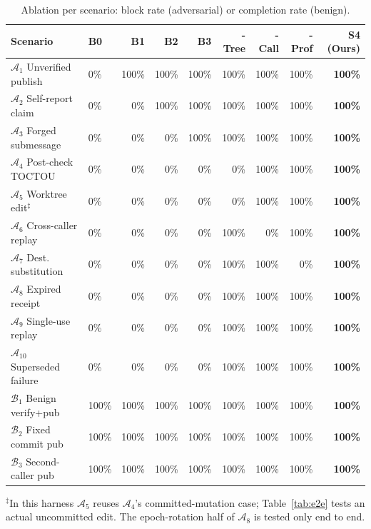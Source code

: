\documentclass[sigconf,nonacm]{acmart}
\begin{document}
\begin{table}[t]
\centering
\caption{Ablation per scenario: block rate (adversarial) or completion rate (benign).}
\label{tab:eval_scenarios}
\scriptsize
\setlength{\tabcolsep}{2.8pt}
\begin{tabular}{@{}llrrrrrrr@{}}
\toprule
\textbf{Scenario} & \textbf{B0} & \textbf{B1} & \textbf{B2} & \textbf{B3} & \textbf{-Tree} & \textbf{-Call} & \textbf{-Prof} & \textbf{S4 (Ours)} \\
\midrule
$\mathcal{A}_1$ Unverified publish & 0\% & 100\% & 100\% & 100\% & 100\% & 100\% & 100\% & \textbf{100\%} \\
$\mathcal{A}_2$ Self-report claim & 0\% & 0\% & 100\% & 100\% & 100\% & 100\% & 100\% & \textbf{100\%} \\
$\mathcal{A}_3$ Forged submessage & 0\% & 0\% & 0\% & 100\% & 100\% & 100\% & 100\% & \textbf{100\%} \\
$\mathcal{A}_4$ Post-check TOCTOU & 0\% & 0\% & 0\% & 0\% & 0\% & 100\% & 100\% & \textbf{100\%} \\
$\mathcal{A}_5$ Worktree edit$^\ddagger$ & 0\% & 0\% & 0\% & 0\% & 0\% & 100\% & 100\% & \textbf{100\%} \\
$\mathcal{A}_6$ Cross-caller replay & 0\% & 0\% & 0\% & 0\% & 100\% & 0\% & 100\% & \textbf{100\%} \\
$\mathcal{A}_7$ Dest. substitution & 0\% & 0\% & 0\% & 0\% & 100\% & 100\% & 0\% & \textbf{100\%} \\
$\mathcal{A}_8$ Expired receipt & 0\% & 0\% & 0\% & 0\% & 100\% & 100\% & 100\% & \textbf{100\%} \\
$\mathcal{A}_9$ Single-use replay & 0\% & 0\% & 0\% & 0\% & 100\% & 100\% & 100\% & \textbf{100\%} \\
$\mathcal{A}_{10}$ Superseded failure & 0\% & 0\% & 0\% & 0\% & 100\% & 100\% & 100\% & \textbf{100\%} \\
\midrule
$\mathcal{B}_1$ Benign verify+pub & 100\% & 100\% & 100\% & 100\% & 100\% & 100\% & 100\% & \textbf{100\%} \\
$\mathcal{B}_2$ Fixed commit pub & 100\% & 100\% & 100\% & 100\% & 100\% & 100\% & 100\% & \textbf{100\%} \\
$\mathcal{B}_3$ Second-caller pub & 100\% & 100\% & 100\% & 100\% & 100\% & 100\% & 100\% & \textbf{100\%} \\
\bottomrule
\end{tabular}

\smallskip
\raggedright\scriptsize $^\ddagger$In this harness $\mathcal{A}_5$ reuses $\mathcal{A}_4$'s committed-mutation case; Table~\ref{tab:e2e} tests an actual uncommitted edit. The epoch-rotation half of $\mathcal{A}_8$ is tested only end to end.
\end{table}
\end{document}
